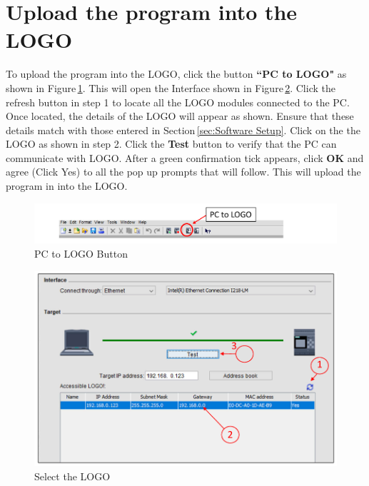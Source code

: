 \documentclass[11pt]{IEEEtran}
\begin{document}
\section{Upload the program into the LOGO}
\noindent To upload the program into the LOGO, click the button \textbf{``PC to LOGO"} as shown in Figure\,\ref{fig:PCtoLOGO}. This will open the Interface shown in Figure\,\ref{fig:PCtoLOGO2}. Click the refresh button in step 1 to locate all the LOGO modules connected to the PC. Once located, the details of the LOGO will appear as shown. Ensure that these details match with those entered in Section\,\ref{sec:Software Setup}. Click on the the LOGO as shown in step 2. Click the \textbf{Test} button to verify that the PC can communicate with LOGO. After a green confirmation tick appears, click \textbf{OK} and agree (Click Yes) to all the pop up prompts that will follow. This will upload the program in into the LOGO. 
\begin{figure}[H]
	\centering
	\includegraphics[scale=0.8]{PCtoLOGO.pdf}
	\caption{PC to LOGO Button}
	\label{fig:PCtoLOGO}
\end{figure}

\begin{figure}[H]
	\centering
	\includegraphics[scale=0.6]{PCtoLOGO2.pdf}
	\caption{Select the LOGO}
	\label{fig:PCtoLOGO2}
\end{figure}
\end{document}
